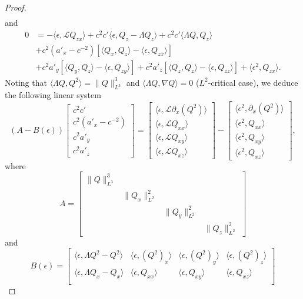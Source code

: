 \documentclass[12pt,letterpaper]{amsart}
\newcommand{\la}{\langle}
\newcommand{\ra}{\rangle}
\theoremstyle{remark}
\numberwithin{equation}{section}
\numberwithin{theorem}{section}
\numberwithin{table}{section}
\begin{document}
\begin{proof}
\begin{align*}
\end{align*}
and
\begin{align*}
0 &=  -\la \epsilon, \mathcal{L}  Q_{zx}\ra + c^2c' \la \epsilon, Q_{z}-\Lambda Q_{z}\ra 
+c^2c' \la \Lambda Q, Q_{z}\ra\\
&+c^2(a'_{x} -c^{-2}) \left[\la Q_{x},Q_{z}\ra-\la \epsilon, Q_{zx}\ra\right]\\
&+c^2a'_{y} \left[\la Q_{y},Q_{z}\ra-\la \epsilon, Q_{zy}\ra\right]+c^2a'_{z} \left[\la Q_{z},Q_{z}\ra-\la \epsilon, Q_{zz}\ra\right]+\la \epsilon^2, Q_{zx}\ra. %
\end{align*}
Noting that $\la \Lambda Q, Q^2\ra=\|Q\|_{L^3}^3$ and $\la \Lambda Q, \nabla Q \ra=0$ ($L^2$-critical case), we deduce the following linear system
\begin{equation}\label{System}
(A - B(\epsilon)) 
\begin{bmatrix} 
c^2c' \\ c^2(a'_{x} -c^{-2})  \\ c^2a'_{y}\\c^2a'_{z} 
\end{bmatrix} 
=  \begin{bmatrix} 
\la \epsilon, \mathcal{L} \partial_{x} (Q^2)\ra \\ 
\la \epsilon, \mathcal{L}  Q_{xx}\ra \\ 
\la \epsilon, \mathcal{L}  Q_{xy}\ra \\
\la \epsilon, \mathcal{L}  Q_{xz}\ra 
\end{bmatrix} 
- \begin{bmatrix} 
\la \epsilon^2, \partial_{x}(Q^2)\ra \\ 
\la \epsilon^2, Q_{xx}\ra \\ 
\la \epsilon^2, Q_{xy}\ra \\
\la \epsilon^2, Q_{xz}\ra  
\end{bmatrix},
\end{equation}
where 
$$
A = 
\begin{bmatrix} 
\|Q\|_{L^3}^3 & & & \\ 
& \|Q_{x}\|_{L^2}^2 && \\ 
& & \|Q_{y}\|_{L^2}^2& \\
&&& \|Q_{z}\|_{L^2}^2 
\end{bmatrix}
$$
and
$$
B(\epsilon) = 
\begin{bmatrix} 
\la \epsilon, \Lambda Q^2 - Q^2\ra & \la \epsilon, (Q^2)_{x}\ra  &  \la \epsilon, (Q^2)_{y}\ra & \la \epsilon, (Q^2)_{z}\ra \\ 
\la \epsilon, \Lambda Q_{x} - Q_{x}\ra & \la \epsilon, Q_{xx}\ra  &  \la \epsilon, Q_{xy}\ra & \la \epsilon, Q_{xz}\ra \\ 

\end{bmatrix}$$
\end{proof}
\end{document}
